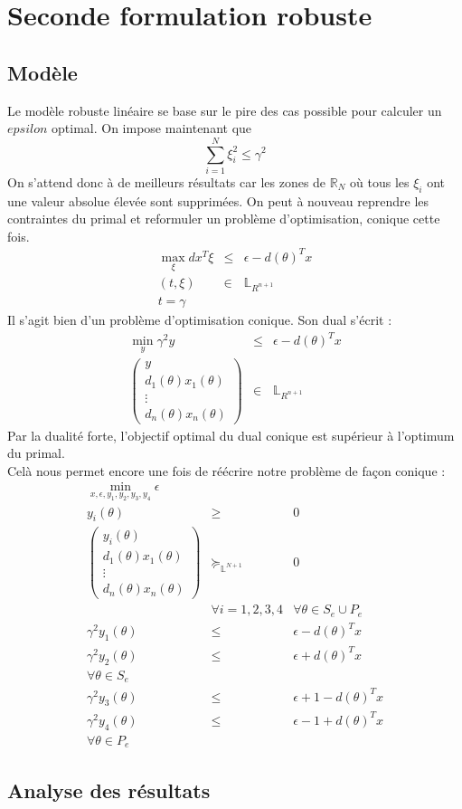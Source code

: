 \section{Seconde formulation robuste}
\subsection{Modèle}
Le modèle robuste linéaire se base sur le pire des cas possible pour calculer un $epsilon$ optimal. On impose maintenant que
$$\sum_{i=1}^N \xi_i^2 \leq \gamma^2$$
On s'attend donc à de meilleurs résultats car les zones de $\mathbb{R}_N$ où tous les $\xi_i$ ont une valeur absolue élevée sont supprimées.
On peut à nouveau reprendre les contraintes du primal et reformuler un problème d'optimisation, conique cette fois.
\begin{eqnarray}
\max_{\xi} dx^T \xi & \leq & \epsilon - d(\theta)^Tx \\
(t,\xi) & \in  & \mathbb{L}_{R^{n+1}}\\ 
t = \gamma
\end{eqnarray}
Il s'agit bien d'un problème d'optimisation conique. Son dual s'écrit :
\begin{eqnarray}
\min_{y} \gamma^2 y & \leq & \epsilon - d(\theta)^Tx \\
\begin{pmatrix}
y \\
d_1(\theta)x_1(\theta) \\
\vdots \\
d_n(\theta)x_n(\theta)
\end{pmatrix}
 & \in & \mathbb{L}_{R^{n+1}}
\end{eqnarray}
Par la dualité forte, l'objectif optimal du dual conique est supérieur à l'optimum du primal.\\
Celà nous permet encore une fois de réécrire notre problème de façon conique :
\begin{eqnarray*}
\min_{x,\epsilon ,y_1,y_2,y_3,y_4} \epsilon & & \\
y_{i}(\theta) & \geq & 0 \\
\begin{pmatrix}
y_i(\theta) \\
d_1(\theta)x_1(\theta)\\
\vdots \\
d_n(\theta)x_n(\theta)
\end{pmatrix}
& \succeq_{\mathbb{L}^{N+1}}& 0\\
& \forall i = 1,2,3,4 & 
\forall \theta \in S_e \cup P_e \\
\gamma^2 y_{1}(\theta) & \leq & \epsilon -d(\theta)^Tx \\
\gamma^2 y_{2}(\theta) & \leq & \epsilon + d(\theta)^Tx \\
\forall \theta \in S_e & & \\
\gamma^2 y_{3}(\theta) & \leq & \epsilon +1 -d(\theta)^Tx \\
\gamma^2 y_{4}(\theta) & \leq & \epsilon -1 + d(\theta)^Tx \\
\forall \theta \in P_e & &
\end{eqnarray*}
\subsection{Analyse des résultats}